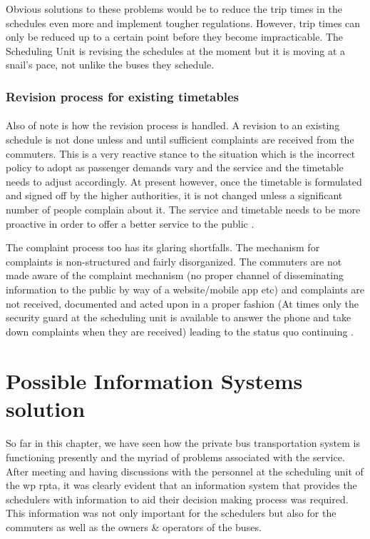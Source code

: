 Obvious solutions to these problems would be to reduce the trip times in the schedules even more and implement tougher regulations. However, trip times can only be reduced up to a certain point before they become impracticable. The Scheduling Unit is revising the schedules at the moment but it is moving at a snail's pace, not unlike the buses they schedule. 

\subsubsection{Revision process for existing timetables} 

\paragraph{} Also of note is how the revision process is handled. A revision to an existing schedule is not done unless and until sufficient complaints are received from the commuters. This is a very reactive stance to the situation which is the incorrect policy to adopt as passenger demands vary and the service and the timetable needs to adjust accordingly. At present however, once the timetable is formulated and signed off by the higher authorities, it is not changed unless a significant number of people complain about it. The service and timetable needs to be more proactive in order to offer a better service to the public \cite{Mahesh2013a, Theja2013a, Mahesh2013b, Navaratne2013a, Navaratne2013b, Ranjith2013a}.

The complaint process too has its glaring shortfalls. The mechanism for complaints is non-structured and fairly disorganized. The commuters are not made aware of the complaint mechanism (no proper channel of disseminating information to the public by way of a website/mobile app etc) and complaints are not received, documented and acted upon in a proper fashion (At times only the security guard at the scheduling unit is available to answer the phone and take down complaints when they are received) leading to the status quo continuing \cite{Mahesh2013a, Theja2013a, Mahesh2013b, Navaratne2013a, Navaratne2013b, Ranjith2013a}.



\section{Possible Information Systems solution}
\label{section-possibleISSolution}

\paragraph{} So far in this chapter, we have seen how the private bus transportation system is functioning presently and the myriad of problems associated with the service. After meeting and having discussions with the personnel at the scheduling unit of the \acrshort{wp} \acrshort{rpta}, it was clearly evident that an information system that provides the schedulers with information to aid their decision making process was required. This information was not only important for the schedulers but also for the commuters as well as the owners \& operators of the buses. 

